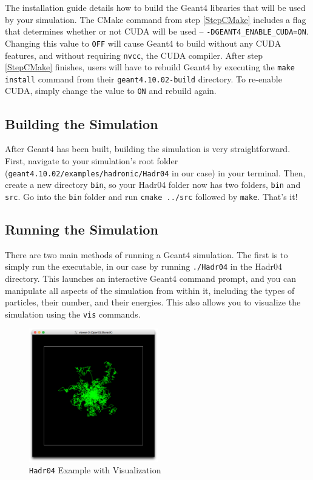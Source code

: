 \documentclass[12pt]{article}
\begin{document}
The installation guide details how to build the Geant4 libraries that will be used by your simulation. The CMake command from step \ref{StepCMake} includes a flag that determines whether or not CUDA will be used -- \texttt{-DGEANT4\_ENABLE\_CUDA=ON}. Changing this value to \texttt{OFF} will cause Geant4 to build without any CUDA features, and without requiring \texttt{nvcc}, the CUDA compiler. After step \ref{StepCMake} finishes, users will have to rebuild Geant4 by executing the \texttt{make install} command from their \texttt{geant4.10.02-build} directory. To re-enable CUDA, simply change the value to \texttt{ON} and rebuild again.


\subsection{Building the Simulation}\label{SecSimulations} %
After Geant4 has been built, building the simulation is very straightforward. First, navigate to your simulation's root folder (\texttt{geant4.10.02/examples/hadronic/Hadr04} in our case) in your terminal. Then, create a new directory \texttt{bin}, so your Hadr04 folder now has two folders, \texttt{bin} and \texttt{src}. Go into the \texttt{bin} folder and run \texttt{cmake ../src} followed by \texttt{make}. That's it!

\subsection{Running the Simulation}\label{SecRedirect} %
There are two main methods of running a Geant4 simulation. The first is to simply run the executable, in our case by running \texttt{./Hadr04} in the Hadr04 directory. This launches an interactive Geant4 command prompt, and you can manipulate all aspects of the simulation from within it, including the types of particles, their number, and their energies. This also allows you to visualize the simulation using the \texttt{vis} commands.\\

\begin{figure}[!hbtp]
\centering
\caption{\texttt{Hadr04} Example with Visualization}\label{FigVis}
\includegraphics[width=0.5\textwidth]{hadr04_vis.png}
\end{figure}
\end{document}
